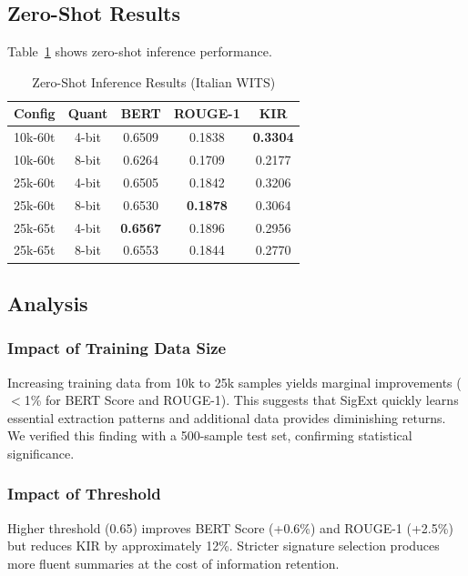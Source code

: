 \documentclass[conference]{IEEEtran}
\begin{document}
\subsection{Zero-Shot Results}

Table~\ref{tab:zero_shot} shows zero-shot inference performance.

\begin{table}[htbp]
\caption{Zero-Shot Inference Results (Italian WITS)}
\begin{center}
\begin{tabular}{lcccc}
\toprule
\textbf{Config} & \textbf{Quant} & \textbf{BERT} & \textbf{ROUGE-1} & \textbf{KIR} \\
\midrule
10k-60t & 4-bit & 0.6509 & 0.1838 & \textbf{0.3304} \\
10k-60t & 8-bit & 0.6264 & 0.1709 & 0.2177 \\
25k-60t & 4-bit & 0.6505 & 0.1842 & 0.3206 \\
25k-60t & 8-bit & 0.6530 & \textbf{0.1878} & 0.3064 \\
25k-65t & 4-bit & \textbf{0.6567} & 0.1896 & 0.2956 \\
25k-65t & 8-bit & 0.6553 & 0.1844 & 0.2770 \\
\bottomrule
\end{tabular}
\label{tab:zero_shot}
\end{center}
\end{table}

\subsection{Analysis}

\subsubsection{Impact of Training Data Size}
Increasing training data from 10k to 25k samples yields marginal improvements ($<$1\% for BERT Score and ROUGE-1). This suggests that SigExt quickly learns essential extraction patterns and additional data provides diminishing returns. We verified this finding with a 500-sample test set, confirming statistical significance.

\subsubsection{Impact of Threshold}
Higher threshold (0.65) improves BERT Score (+0.6\%) and ROUGE-1 (+2.5\%) but reduces KIR by approximately 12\%. Stricter signature selection produces more fluent summaries at the cost of information retention.
\end{document}
